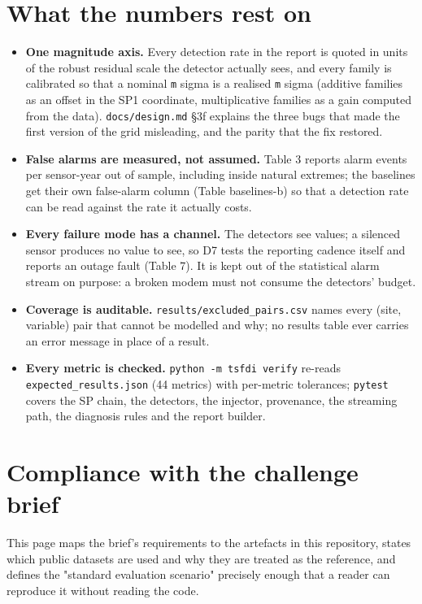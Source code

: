 \documentclass[10pt,a4paper]{article}
\begin{document}
\section*{What the numbers rest on}
\begin{itemize}
\item \textbf{One magnitude axis.} Every detection rate in the report is quoted in units of
the robust residual scale the detector actually sees, and every family is calibrated so that a nominal \texttt{m} sigma is a realised \texttt{m} sigma (additive families as an offset in the SP1 coordinate, multiplicative families as a gain computed from the data). \texttt{docs/\allowbreak{}design.md} §3f explains the three bugs that made the first version of the grid misleading, and the parity that the fix restored.

\item \textbf{False alarms are measured, not assumed.} Table 3 reports alarm events per
sensor-\allowbreak{}year out of sample, including inside natural extremes; the baselines get their own false-\allowbreak{}alarm column (Table baselines-\allowbreak{}b) so that a detection rate can be read against the rate it actually costs.

\item \textbf{Every failure mode has a channel.} The detectors see values; a silenced
sensor produces no value to see, so D7 tests the reporting cadence itself and reports an outage fault (Table 7). It is kept out of the statistical alarm stream on purpose: a broken modem must not consume the detectors' budget.

\item \textbf{Coverage is auditable.} \texttt{results/\allowbreak{}excluded\_\allowbreak{}pairs.csv} names every (site,
variable) pair that cannot be modelled and why; no results table ever carries an error message in place of a result.

\item \textbf{Every metric is checked.} \texttt{python -\allowbreak{}m tsfdi verify} re-\allowbreak{}reads
\texttt{expected\_\allowbreak{}results.json} (44 metrics) with per-\allowbreak{}metric tolerances; \texttt{pytest} covers the SP chain, the detectors, the injector, provenance, the streaming path, the diagnosis rules and the report builder.

\end{itemize}

\clearpage
\section*{Compliance with the challenge brief}
This page maps the brief's requirements to the artefacts in this repository, states which public datasets are used and why they are treated as the reference, and defines the "standard evaluation scenario" precisely enough that a reader can reproduce it without reading the code.
\end{document}
